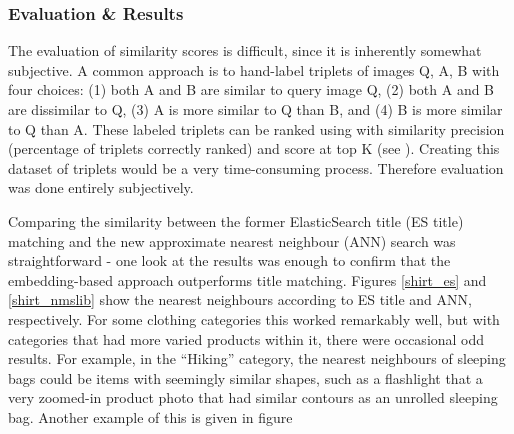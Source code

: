\subsubsection{Evaluation \& Results}

The evaluation of similarity scores is difficult, since it is inherently somewhat subjective.
A common approach is to hand-label triplets of images Q, A, B with four choices: (1) both A and B are similar to query image Q, (2) both A and B are dissimilar to Q, (3) A is more similar to Q than B, and (4) B is more similar to Q than A.
These labeled triplets can be ranked using with similarity precision (percentage of triplets correctly ranked) and score at top K (see \cite{imgsimfineg}).
Creating this dataset of triplets would be a very time-consuming process. Therefore evaluation was done entirely subjectively.

Comparing the similarity between the former ElasticSearch title (ES title) matching and the new approximate nearest neighbour (ANN) search was straightforward - one look at the results was enough to confirm that the embedding-based approach outperforms title matching.
Figures \ref{shirt_es} and \ref{shirt_nmslib} show the nearest neighbours according to ES title and ANN, respectively.
For some clothing categories this worked remarkably well, but with categories that had more varied products within it, there were occasional odd results.
For example, in the ``Hiking'' category, the nearest neighbours of sleeping bags could be items with seemingly similar shapes, such as a flashlight that a very zoomed-in product photo that had similar contours as an unrolled sleeping bag.
Another example of this is given in figure

